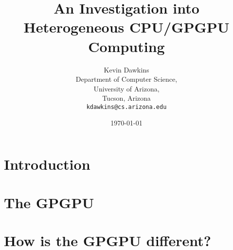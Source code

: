\documentclass[12pt,notitlepage]{report}
\begin{document}
\title{An Investigation into Heterogeneous CPU/GPGPU Computing}
\author{Kevin Dawkins\\
  Department of Computer Science,\\
  University of Arizona,\\
  Tucson, Arizona\\
  \texttt{kdawkins@cs.arizona.edu}}
\date{\today}
\maketitle



\tableofcontents

\chapter*{Introduction}


\chapter*{The GPGPU}


\chapter*{How is the GPGPU different?}


\nocite{nvidia}



\end{document}
